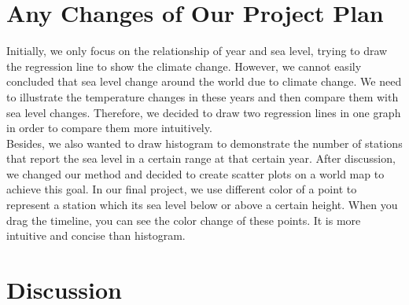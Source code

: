 \documentclass[fontsize=11pt]{article}
\begin{document}
    \section*{Any Changes of Our Project Plan}

    Initially, we only focus on the relationship of year and sea level, trying to draw the regression line to show the climate change. However, we cannot easily concluded that sea level change around the world due to climate change. We need to illustrate the temperature changes in these years and then compare them with sea level changes. Therefore, we decided to draw two regression lines in one graph in order to compare them more intuitively.\\
    Besides, we also wanted to draw histogram to demonstrate the number of stations that report the sea level in a certain range at that certain year. After discussion, we changed our method and decided to create scatter plots on a world map to achieve this goal. In our final project, we use different color of a point to represent a station which its sea level below or above a certain height. When you drag the timeline, you can see the color change of these points. It is more intuitive and concise than histogram.


    \section*{Discussion}
\end{document}
